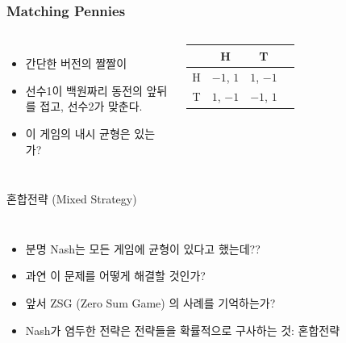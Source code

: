 \documentclass[final]{beamer}
\begin{document}
\begin{frame}\frametitle{Matching Pennies}\vspace{3em}
	\begin{columns}[c]
		\column{18em}
		\begin{itemize}
		\item 간단한 버전의 짤짤이 
		\item 선수1이 백원짜리 동전의 앞뒤를 접고, 선수2가 맞춘다. 
		\item 이 게임의 내시 균형은 있는가? 
		\end{itemize}
		\column{15em}
		\begin{table}
		\setlength{\tabcolsep}{1.2em}
		\begin{tabular}{|c|c|c|c|} \hline
		& {H} &  {T}\\ \hline
		{H} & {$-1$}, {$1$} & {$1$}, {$-1$} \\ \hline%
		{T} & {$1$}, {$-1$}  & {$-1$}, {$1$}\\ 
		\hline
		\end{tabular}
		\end{table}
	\end{columns}
\end{frame}

\begin{frame}[t]{혼합전략 (Mixed Strategy)}
	\begin{columns}[c]
	\column{18em}
	\begin{itemize}
		\item 분명 Nash는 모든 게임에 균형이 있다고 했는데??
		\item 과연 이 문제를 어떻게 해결할 것인가? 
		\item 앞서 ZSG (Zero Sum Game) 의 사례를 기억하는가? 
		\item Nash가 염두한 전략은 전략들을 확률적으로 구사하는 것: 혼합전략
	\end{itemize}
	\column{13em}
	\end{columns}
	\end{frame}
\end{document}
